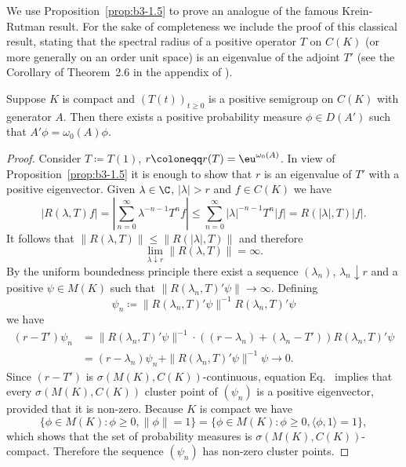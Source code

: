 We use Proposition~\ref{prop:b3-1.5} to prove an analogue of the famous Krein-Rutman result.
For the sake of completeness we include the proof of this classical result, stating that the spectral radius of a positive operator $T$ on $C(K)$ (or more generally on an order unit space) is an eigenvalue of the adjoint $T'$ (see the Corollary of Theorem~2.6 in the appendix of \textcite{schaefer:1966}).
\begin{theorem}\label{thm:b3-1.6}
	Suppose $K$ is compact and $(T(t))_{t \geq 0}$ is a positive semigroup on $C(K)$ with generator $A$.
	Then there exists a positive probability measure $\phi \in D(A')$ such that $A'\phi = \omega_{0}(A)\phi$.
\end{theorem}
\begin{proof}
	Consider $T \coloneqq T(1)$, $r \coloneqq r(T) = \eu^{\omega_{0}(A)}$.
	In view of Proposition~\ref{prop:b3-1.5} it is enough to show that $r$ is an eigenvalue of\/ $T'$ with a positive eigenvector.
	Given $\lambda \in \C$, $|\lambda| > r$ and $f \in C(K)$ we have
	\[
	|R(\lambda,T)f| = \left|\sum_{n=0}^{\infty} \lambda^{-n-1} T^{n}f\right| \leq \sum_{n=0}^{\infty} |\lambda|^{-n-1} T^{n}|f| = R(|\lambda|,T) |f|.
	\]
	It follows that $\|R(\lambda,T)\| \leq \|R(|\lambda|,T)\|$ and therefore
	\begin{equation}\label{eq:b3-1.15}
		\lim_{\lambda \downarrow r}\|R(\lambda,T)\| = \infty.
	\end{equation}
	By the uniform boundedness principle there exist a sequence $(\lambda_{n})$, $\lambda_{n} \downarrow r$ and a positive $\psi \in M(K)$ such that $\|R(\lambda_{n},T)'\psi\| \to \infty$.
	Defining 
    \[
    \psi_{n} \coloneqq \|R(\lambda_{n},T)'\psi\|^{-1}R(\lambda_{n},T)'\psi
    \] we have
	\begin{equation}\label{eq:b3-1.16}
		\begin{split}
		(r - T')\psi_{n} & = \|R(\lambda_{n},T)'\psi\|^{-1}\cdot((r-\lambda_{n}) + (\lambda_{n} - T'))R(\lambda_{n},T)'\psi\\ 
		& = (r-\lambda_{n})\psi_{n} + \|R(\lambda_{n},T)'\psi\|^{-1}\psi \to 0.
		\end{split}
	\end{equation}
	Since $(r - T')$ is $\sigma(M(K),C(K))$-continuous, equation Eq.~ implies that every $\sigma(M(K),C(K))$ cluster point of\/ $(\psi_{n})$ is a positive eigenvector, provided that it is non-zero.
	Because $K$ is compact we have 
%
\[
	\{\phi \in M(K) \colon \phi \geq 0, \|\phi\| = 1\} 
	= \{\phi \in M(K) \colon \phi \geq 0, \langle \phi,1 \rangle = 1\} , 
\]
which shows that the set of probability measures is $\sigma(M(K),C(K))$-compact.
	Therefore the sequence $(\psi_{n})$ has non-zero cluster points.
\end{proof}

